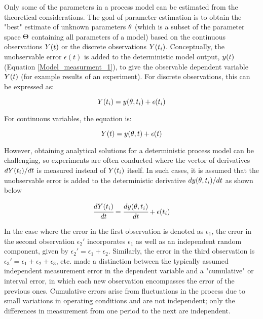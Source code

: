 \documentclass[../Article_Model_Parameters.tex]{subfiles}
\begin{document}
	Only some of the parameters in a process model can be estimated from the theoretical considerations. The goal of parameter estimation is to obtain the "best" estimate of unknown parameters ${\color{black} \theta}$ (which is a subset of the parameter space ${\color{black}\Theta}$ containing all parameters of a model) based on the continuous observations ${\color{black}Y}(t)$ or the discrete observations ${\color{black}Y}(t_i)$. Conceptually, the unobservable error $\epsilon(t)$ is added to the deterministic model output, ${\color{black}y}(t)$ (Equation \ref{Model_measurment_1}), to give the observable dependent variable ${\color{black}Y}(t)$ (for example results of an experiment). For discrete observations, this can be expressed as:
	
	{\footnotesize
		\begin{equation*}
			{\color{black}Y}(t_i) = {\color{black}y}({\color{black} \theta}, t_i) + \epsilon(t_i)
	\end{equation*} }
	
	For continuous variables, the equation is:
	
	{\footnotesize
		\begin{equation*}
			{\color{black}Y}(t) = {\color{black}y}({\color{black} \theta}, t) + \epsilon(t)
	\end{equation*} }
	
	However, obtaining analytical solutions for a deterministic process model can be challenging, so experiments are often conducted where the vector of derivatives $d{\color{black}Y}(t_i)/dt$ is measured instead of ${\color{black}Y}(t_i)$ itself. In such cases, it is assumed that the unobservable error is added to the deterministic derivative $d{\color{black}y}({\color{black} \theta}, t_i)/dt$ as shown below
	
	{\footnotesize
		\begin{equation}  \label{EQ: Measurment_noise}
			\cfrac{d {\color{black}Y}(t_i)}{dt} = \cfrac{d{\color{black}y}({\color{black} \theta}, t_i)}{dt} + \epsilon(t_i)
	\end{equation} }
	
	In the case where the error in the first observation is denoted as $\epsilon_1$, the error in the second observation $\epsilon_2'$ incorporates $\epsilon_1$ as well as an independent random component, given by $\epsilon_2' = \epsilon_1 + \epsilon_2$. Similarly, the error in the third observation is $\epsilon_3' = \epsilon_1 + \epsilon_2 + \epsilon_3$, etc. \citet{Mandel1957}  made a distinction between the typically assumed independent measurement error in the dependent variable and a "cumulative" or interval error, in which each new observation encompasses the error of the previous ones. Cumulative errors arise from fluctuations in the process due to small variations in operating conditions and are not independent; only the differences in measurement from one period to the next are independent.
	
\end{document}
